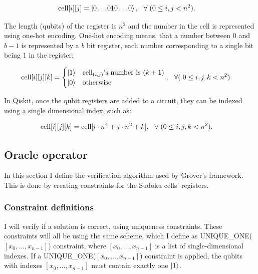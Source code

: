 \begin{align*}
\text{cell}[i][j] = \ket{0\dots{}010\dots{}0}, & \hspace{3mm}\forall{}\hspace{1mm}(0\leq{}i,j<n^2).
\end{align*}

The length (qubits) of the register is $n^2$ and the number in the cell is represented using one-hot encoding. One-hot encoding means, that a number between $0$ and $b-1$ is represented by a $b$ bit register, each number corresponding to a single bit being $1$ in the register:

\begin{align*}
\text{cell}[i][j][k] = \begin{cases}
\ket{1} & \text{cell}_{(i,j)}\text{'s number is }(k+1) \\
\ket{0} & \text{otherwise}
\end{cases}, & \hspace{3mm}\forall{}(\hspace{1mm}0\leq{}i,j,k<n^2).
\end{align*}

In Qiskit, once the qubit registers are added to a circuit, they can be indexed using a single dimensional index, such as:

\begin{align*}
\text{cell}[i][j][k] = \text{cell}[i\cdot{}n^4+j\cdot{}n^2+k], & \hspace{3mm}\forall{}\hspace{1mm}(0\leq{}i,j,k<n^2).
\end{align*}

\subsection{Oracle operator}

In this section I define the verification algorithm used by Grover's framework. This is done by creating constraints for the Sudoku cells' registers.

\subsubsection{Constraint definitions}

I will verify if a solution is correct, using uniqueness constraints. These constraints will all be using the same scheme, which I define as UNIQUE\_ONE($[x_0,\dots,{}x_{n-1}]$) constraint, where $[x_0,\dots,{}x_{n-1}]$ is a list of single-dimensional indexes. If a UNIQUE\_ONE($[x_0,\dots,{}x_{n-1}]$) constraint is applied, the qubits with indexes $[x_0,\dots,{}x_{n-1}]$ must contain exactly one $\ket{1}$.

